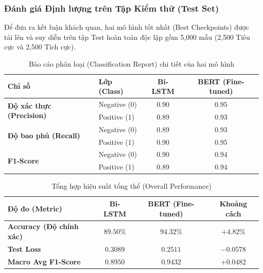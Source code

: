 \documentclass[a4paper]{article}
\theoremstyle{definition}
\begin{document}
\subsubsection{Đánh giá Định lượng trên Tập Kiểm thử (Test Set)}
Để đưa ra kết luận khách quan, hai mô hình tốt nhất (Best Checkpoints) được tải lên và suy diễn trên tập Test hoàn toàn độc lập gồm 5,000 mẫu (2,500 Tiêu cực và 2,500 Tích cực).

\begin{table}[H]
	\centering
	\caption{Báo cáo phân loại (Classification Report) chi tiết của hai mô hình}
	\begin{tabular}{|l|l|c|c|}
		\hline
		\textbf{Chỉ số}                                   & \textbf{Lớp (Class)} & \textbf{Bi-LSTM} & \textbf{BERT (Fine-tuned)} \\
		\hline
		\multirow{2}{*}{\textbf{Độ xác thực (Precision)}} & Negative (0)         & $0.90$           & $\mathbf{0.95}$            \\
		                                                  & Positive (1)         & $0.89$           & $\mathbf{0.93}$            \\
		\hline
		\multirow{2}{*}{\textbf{Độ bao phủ (Recall)}}     & Negative (0)         & $0.89$           & $\mathbf{0.93}$            \\
		                                                  & Positive (1)         & $0.90$           & $\mathbf{0.95}$            \\
		\hline
		\multirow{2}{*}{\textbf{F1-Score}}                & Negative (0)         & $0.90$           & $\mathbf{0.94}$            \\
		                                                  & Positive (1)         & $0.89$           & $\mathbf{0.94}$            \\
		\hline
	\end{tabular}
\end{table}

\begin{table}[H]
	\centering
	\caption{Tổng hợp hiệu suất tổng thể (Overall Performance)}
	\begin{tabular}{|l|c|c|c|}
		\hline
		\textbf{Độ đo (Metric)}          & \textbf{Bi-LSTM} & \textbf{BERT (Fine-tuned)} & \textbf{Khoảng cách} \\
		\hline
		\textbf{Accuracy (Độ chính xác)} & $89.50\%$        & $\mathbf{94.32\%}$         & $+4.82\%$            \\
		\hline
		\textbf{Test Loss}               & $0.3089$         & $\mathbf{0.2511}$          & $-0.0578$            \\
		\hline
		\textbf{Macro Avg F1-Score}      & $0.8950$         & $\mathbf{0.9432}$          & $+0.0482$            \\
		\hline
	\end{tabular}
\end{table}
\end{document}
